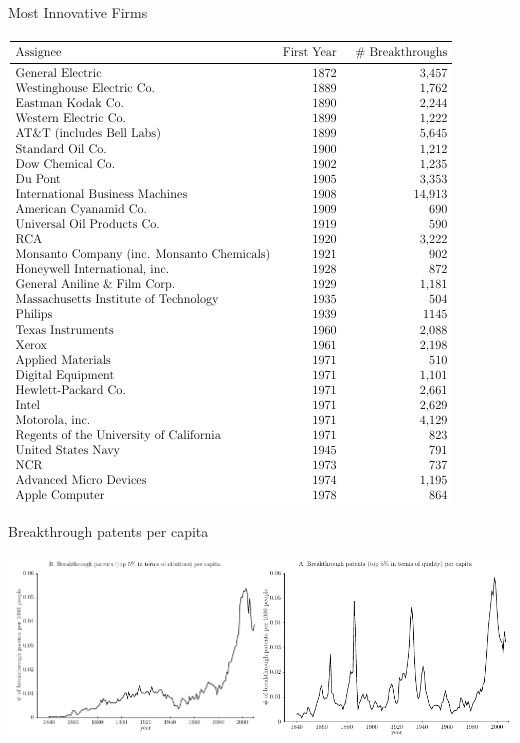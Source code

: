 \documentclass[english]{beamer}
\begin{document}
\begin{frame}{Most Innovative Firms}
\begin{center}
\includegraphics[height=0.8\textheight]{Images/kelly-7}
\par\end{center}

\end{frame}

%

\begin{frame}{Breakthrough patents per capita}
\begin{center}
\includegraphics[width=0.5\textwidth]{Images/kelly-4}\includegraphics[width=0.5\textwidth]{Images/kelly-5}
\par\end{center}

\end{frame}
\end{document}
